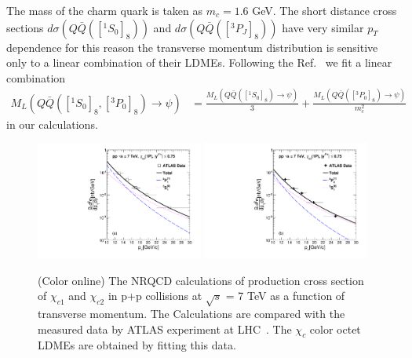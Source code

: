 \documentclass[12pt,a4paper,final]{iopart}
\newcommand{\barQ}{{\bar{Q}}}
\begin{document}
The mass of the charm quark is taken as $m_{c}=1.6$ GeV. The short distance cross 
sections $d\sigma(Q\barQ([^1S_0]_{8}))$ and $d\sigma(Q\barQ([^3P_J]_{8}))$ have
very similar $p_{T}$ dependence for this reason the transverse momentum distribution 
is sensitive only to a linear combination of their LDMEs.
Following the Ref.~\cite{Cho:1995vh,Beneke:1996yw} we fit a linear combination 
\begin{equation}
  \begin{split}
    M_{L}(Q\barQ([^1S_0]_{8},[^3P_0]_{8})\rightarrow \psi)&= \frac{M_{L}(Q\barQ([^1S_0]_{8})\rightarrow \psi)}{3} + \frac{M_{L}(Q\barQ([^3P_0]_{8})\rightarrow \psi)}{m_{c}^{2}} \nonumber
  \end{split}
\end{equation}
in our calculations.
\begin{figure}
\includegraphics[width=0.49\textwidth]{Fig1a_Chic1_ATLAS_Fit.pdf}
\includegraphics[width=0.49\textwidth]{Fig1b_Chic2_ATLAS_Fit.pdf}
\caption{(Color online) The NRQCD calculations of production cross section 
of  $\chi_{c1}$ and $\chi_{c2}$ in p+p collisions at
$\sqrt{s}$ = 7 TeV as a function of transverse momentum. 
The Calculations are compared with the measured data by
ATLAS experiment at LHC~\cite{ATLAS:2014ala}. The $\chi_{c}$
color octet LDMEs are obtained by fitting this data. 
}
\label{Fig:LDMEChicATLAS}
\end{figure}
\end{document}
